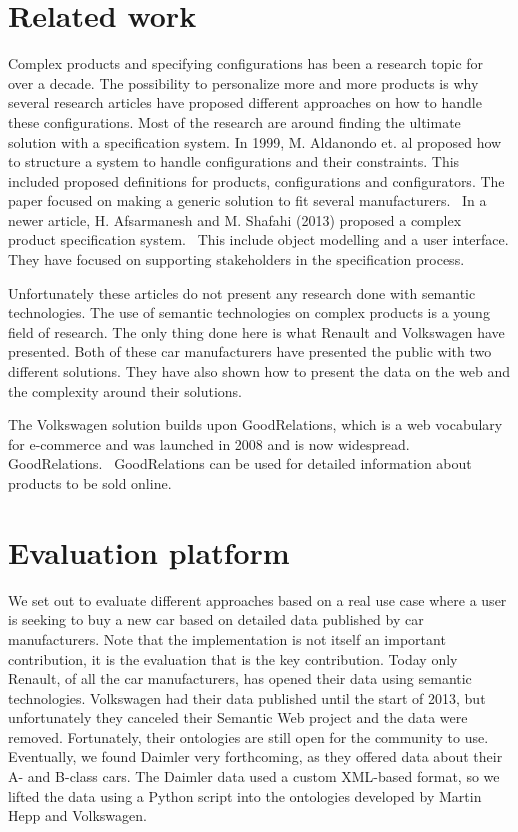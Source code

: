 \documentclass{llncs}
\begin{document}
\section{Related work}
Complex products and specifying configurations has been a research
topic for over a decade.  The possibility to personalize more and more
products is why several research articles have proposed different
approaches on how to handle these configurations. Most of the research
are around finding the ultimate solution with a specification
system. In 1999, M. Aldanondo et. al proposed how to structure a
system to handle configurations and their constraints. This included
proposed definitions for products, configurations and
configurators. The paper focused on making a generic solution to fit
several manufacturers.~\cite{OldConf} In a newer article,
H. Afsarmanesh and M. Shafahi (2013) proposed a complex product
specification system.~\cite{NewConf} This include object modelling and
a user interface. They have focused on supporting stakeholders in the
specification process.

Unfortunately these articles do not present any research done with
semantic technologies. The use of semantic technologies on complex
products is a young field of research. The only thing done here is
what Renault and Volkswagen have presented. Both of these car
manufacturers have presented the public with two different
solutions. They have also shown how to present the data on the web and
the complexity around their solutions.

The Volkswagen solution builds upon GoodRelations, which is a web
vocabulary for e-commerce and was launched in 2008 and is now
widespread. GoodRelations.~\cite{GR} GoodRelations can be used for
detailed information about products to be sold online.


\section{Evaluation platform}

We set out to evaluate different approaches based on a real use case
where a user is seeking to buy a new car based on detailed data
published by car manufacturers. Note that the implementation is not
itself an important contribution, it is the evaluation that is the key
contribution. Today only Renault, of all the car manufacturers, has
opened their data using semantic technologies. Volkswagen had their
data published until the start of 2013, but unfortunately they
canceled their Semantic Web project and the data were removed.
Fortunately, their ontologies are still open for the community to
use. Eventually, we found Daimler very forthcoming, as they offered
data about their A- and B-class cars.  The Daimler data used a custom
XML-based format, so we lifted the data using a Python script into the
ontologies developed by Martin Hepp and Volkswagen.
\end{document}
